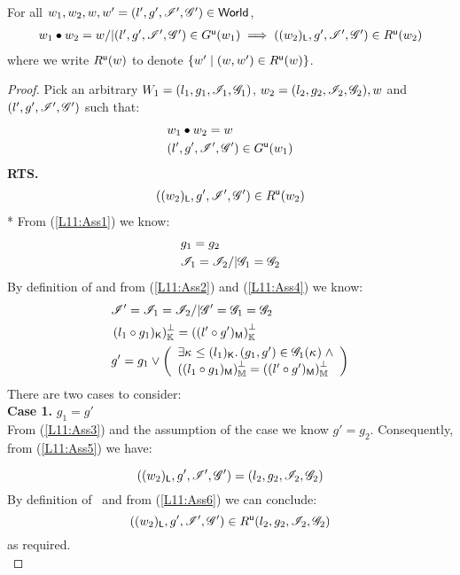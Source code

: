 \begin{lemma}[] \label{lem:updateGContainment}
%
For all $w_1, w_2, w, w' = (l', g', \mathscr{I}', \mathscr{G}') \in \textsf{World}$,
%
\[
\begin{array}{l}
	w_1 \bullet w_2 = w /| (l', g', \mathscr{I}', \mathscr{G}{}') \in G^{\textsf{u}}(w_1) \implies ((w_2)_{\textsf{L}}, g', \mathscr{I}', \mathscr{G}{}') \in R^{\textsf{u}}(w_2)
\end{array}
\]
%
where we write $R^{\textsf{u}}(w)$ to denote $\left\{w' \mid (w, w') \in R^{\textsf{u}}(w) \right\}$.
%
\begin{proof} Pick an arbitrary $W_1 = (l_1, g_1, \mathscr{I}_{1}, \mathscr{G}_{1})$, $w_2 = (l_2, g_2, \mathscr{I}_{2}, \mathscr{G}_{2}), w$ and $(l', g', \mathscr{I}', \mathscr{G}')$ such that:
%
\begin{align}
	& w_1 \bullet w_2 = w \label{L11:Ass1}\\
	& (l', g', \mathscr{I}', \mathscr{G}') \in G^{\textsf{u}}(w_1) \label{L11:Ass2}
\end{align}
%
\textbf{RTS.}
%
\begin{align*}
	((w_2)_{\textsf{L}}, g', \mathscr{I}', \mathscr{G}') \in R^{\textsf{u}}(w_2) 
\end{align*}
*
From (\ref{L11:Ass1}) we know:
%
\begin{align}
	&g_1 = g_2 \label{L11:Ass3}\\
	&\mathscr{I}_{1} = \mathscr{I}_{2} /|  \mathscr{G}_{1} = \mathscr{G}_{2} \label{L11:Ass4}
\end{align}
%
By definition of \updateG and from (\ref{L11:Ass2}) and (\ref{L11:Ass4}) we know:
%
\begin{align}
	& \mathscr{I}' = \mathscr{I}_{1} = \mathscr{I}_{2} /| \mathscr{G}{}' = \mathscr{G}_{1} = \mathscr{G}_{2} \label{L11:Ass5} \\
	& \left( l_1 \circ g_1)_{\textsf{K}}\right)_{\mathbb{K}}^{\bot} = \left( (l' \circ g')_{\textsf{M}}\right)_{\mathbb{K}}^{\bot} \label{L11:Perms} \\
	& g' = g_1 \lor 
	\left(\begin{array}{l}
		\exists \kappa_{} \leq (l_1)_{\textsf{K}}.\,  (g_1, g') \in \mathscr{G}_{1}(\kappa_{}) \;\land \\
		\left( (l_1 \circ g_1)_{\textsf{M}}\right)_{\mathbb{M}}^{\bot} = \left( (l' \circ g')_{\textsf{M}}\right)_{\mathbb{M}}^{\bot}
	\end{array} \right) \nonumber
\end{align}
%
There are two cases to consider:\\

\noindent\textbf{Case 1.} $g_1 = g'$\\
From (\ref{L11:Ass3}) and the assumption of the case we know $g' = g_2$. Consequently, from (\ref{L11:Ass5}) we have:

\begin{equation}
	((w_2)_{\textsf{L}}, g', \mathscr{I}', \mathscr{G}') = (l_2, g_2, \mathscr{I}_{2}, \mathscr{G}_{2}) \label{L11:Ass6}
\end{equation}
%
By definition of \updateR\ and from (\ref{L11:Ass6}) we can conclude:
%
\begin{equation}
	((w_2)_{\textsf{L}}, g', \mathscr{I}', \mathscr{G}') \in R^{\textsf{u}}(l_2, g_2, \mathscr{I}_{2}, \mathscr{G}_{2}) \label{L11:Ass7}
\end{equation}
%
as required.\\


\end{proof}
\end{lemma}
